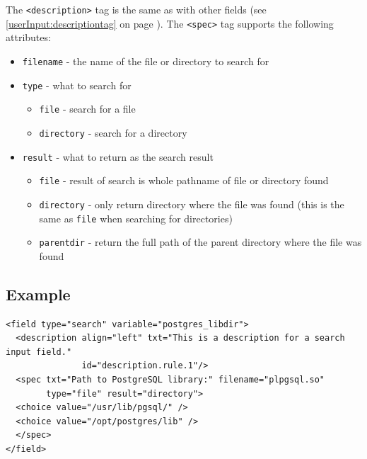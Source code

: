 The \texttt{<description>} tag is the same as with other fields (see
\ref{userInput:descriptiontag} on page \pageref{userInput:descriptiontag}). The
\texttt{<spec>} tag supports the following attributes:

\begin{itemize}
\item \texttt{filename} - the name of the file or directory to search for
\item \texttt{type} - what to search for
  \begin{itemize}
  \item \texttt{file} - search for a file
  \item \texttt{directory} - search for a directory
  \end{itemize}
\item \texttt{result} - what to return as the search result
  \begin{itemize}
  \item \texttt{file} - result of search is whole pathname of file or directory found
  \item \texttt{directory} - only return directory where the file was found (this is the same as \texttt{file} when searching for directories)
  \item \texttt{parentdir} - return the full path of the parent directory where the file was found
  \end{itemize}
\end{itemize}

\subsection{Example}

\footnotesize
\begin{verbatim}
<field type="search" variable="postgres_libdir">
  <description align="left" txt="This is a description for a search input field."
               id="description.rule.1"/>
  <spec txt="Path to PostgreSQL library:" filename="plpgsql.so"
        type="file" result="directory">
  <choice value="/usr/lib/pgsql/" />
  <choice value="/opt/postgres/lib" />
  </spec>
</field>
\end{verbatim}
\normalsize
